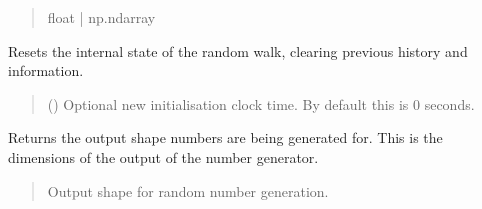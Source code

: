 \documentclass[letterpaper,10pt,english]{sphinxmanual}
\begin{document}
\begin{fulllineitems}
\begin{fulllineitems}
\begin{quote}
\begin{description}
\sphinxAtStartPar
float | np.ndarray

\end{description}\end{quote}

\end{fulllineitems}


\begin{fulllineitems}
\label{\detokenize{modules/util/rng:qnav.util.rng.GaussianMarkov.reset}}
\pysigstartsignatures
{}
\pysigstopsignatures
\sphinxAtStartPar
Resets the internal state of the random walk, clearing previous
history and information.
\begin{quote}\begin{description}
\sphinxAtStartPar
{} () \textendash{} Optional new initialisation clock time.
By default this is 0 seconds.

\end{description}\end{quote}

\end{fulllineitems}


\begin{fulllineitems}
\label{\detokenize{modules/util/rng:qnav.util.rng.GaussianMarkov.output_shape}}
\pysigstartsignatures
{}
\pysigstopsignatures
\sphinxAtStartPar
Returns the output shape numbers are being generated for.
This is the dimensions of the output of the number generator.
\begin{quote}\begin{description}
\sphinxAtStartPar
Output shape for random number generation.


\end{description}
\end{quote}
\end{fulllineitems}
\end{fulllineitems}
\end{document}
